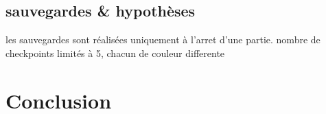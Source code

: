\documentclass{report}
\begin{document}
	\section{sauvegardes & hypothèses}
		les sauvegardes sont réalisées uniquement à l'arret d'une partie. 
		nombre de checkpoints limités à 5, chacun de couleur differente
			
\chapter{Conclusion}
		
		
\end{document}

